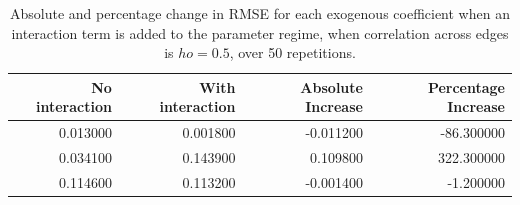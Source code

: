 \begin{table}
\caption{Absolute and percentage change in RMSE for each exogenous coefficient when an interaction term is added to the parameter regime, when correlation across edges is $
ho=0.5$, over 50 repetitions.}
\label{tab:exogcorr_gamma_comparison}
\begin{tabular}{rrrr}
\toprule
No interaction & With interaction & Absolute Increase & Percentage Increase \\
\midrule
0.013000 & 0.001800 & -0.011200 & -86.300000 \\
0.034100 & 0.143900 & 0.109800 & 322.300000 \\
0.114600 & 0.113200 & -0.001400 & -1.200000 \\
\bottomrule
\end{tabular}
\end{table}
